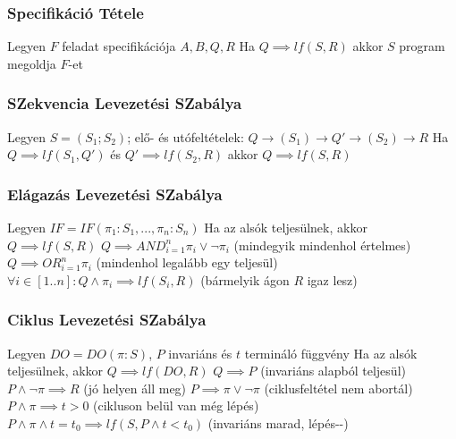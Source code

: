 \documentclass[12pt,a4paper]{article}
\begin{document}
\subsubsection{Specifikáció Tétele}

\begin{outline}
	\1 Legyen $F$ feladat specifikációja $A,B,Q,R$
	\1 Ha $Q \implies lf(S,R)$ akkor $S$ program megoldja $F$-et
\end{outline}

\subsubsection{SZekvencia Levezetési SZabálya}

\begin{outline}
	\1 Legyen $S=(S_1;S_2)$; elő- és utófeltételek: $Q \to (S_1) \to Q' \to (S_2) \to R$
	\1 Ha $Q \implies lf(S_1,Q')$ és $Q' \implies lf(S_2,R)$ akkor $Q \implies lf(S,R)$
\end{outline}

\subsubsection{Elágazás Levezetési SZabálya}

\begin{outline}
	\1 Legyen $IF=IF(\pi_1:S_1,...,\pi_n:S_n)$
	\1 Ha az alsók teljesülnek, akkor $Q \implies lf(S,R)$
		\2 $Q \implies AND_{i=1}^{n} \pi_i \lor \lnot \pi_i$ \;\; (mindegyik mindenhol értelmes)
		\2 $Q \implies OR_{i=1}^{n} \pi_i$ \;\;\;\;\;\;\;\;\;\;\;\;\;\; (mindenhol legalább egy teljesül)
		\2 $\forall i \in [1..n]: Q \wedge \pi_i \implies lf(S_i,R)$ \;\; (bármelyik ágon $R$ igaz lesz)
\end{outline}

\subsubsection{Ciklus Levezetési SZabálya}

\begin{outline}
	\1 Legyen $DO=DO(\pi:S)$, $P$ invariáns és $t$ termináló függvény
	\1 Ha az alsók teljesülnek, akkor $Q \implies lf(DO, R)$
		\2 $Q \implies P$ \;\; (invariáns alapból teljesül)
		\2 $P \wedge \lnot \pi \implies R$ \;\; (jó helyen áll meg)
		\2 $P \implies \pi \lor \lnot \pi$ \;\; (ciklusfeltétel nem abortál)
		\2 $P \wedge \pi \implies t > 0$ \;\; (cikluson belül van még lépés)
		\2 $P \wedge \pi \wedge t = t_0 \implies lf(S,P \wedge t<t_0)$ \;\; (invariáns marad, lépés\;-\;-)
\end{outline}
\end{document}
